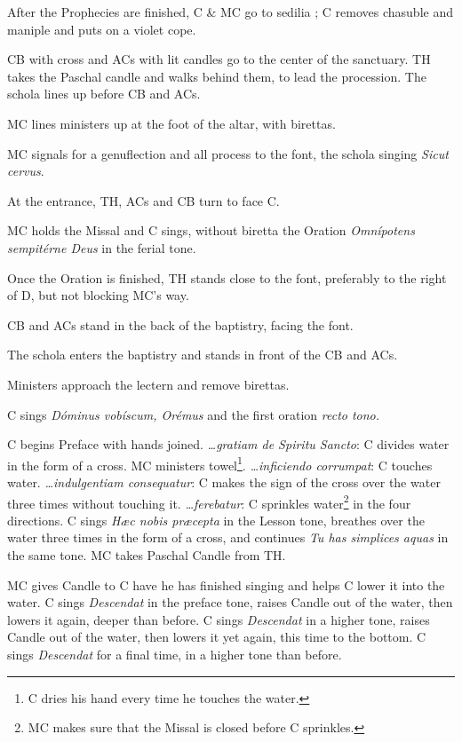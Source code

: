 {\rubric After the Prophecies are finished, C \& MC go to sedilia \pbr; C
removes chasuble and maniple and puts on a violet cope.

\rubric CB with cross and ACs with lit candles go to the center of the
sanctuary. TH takes the Paschal candle and walks behind them, to lead the
procession. The schola lines up before CB and ACs.

\rubric MC lines ministers up at the foot of the altar, with birettas.

\rubric MC signals for a genuflection and all process to the font, the schola
singing \textit{Sicut cervus}.

\rubric At the entrance, TH, ACs and CB turn to face C.

\rubric MC holds the Missal and C sings, without biretta the Oration
\textit{Omnípotens sempitérne Deus} in the ferial tone.

\rubric Once the Oration is finished, TH stands close to the font, preferably
to the right of D, but not blocking MC's way.

\rubric CB and ACs stand in the back of the baptistry, facing the font.

\rubric The schola enters the baptistry and stands in front of the CB and ACs.

\rubric Ministers approach the lectern and remove birettas.

\rubric C sings \textit{Dóminus vobíscum, Orémus} and the first oration
\textit{recto tono.}

\rubric C begins Preface with hands joined. \textit{\dots gratiam de Spiritu
Sancto}: C divides water in the form of a cross. MC ministers towel\footnote{C
dries his hand every time he touches the water.}. \textit{\dots inficiendo
corrumpat}: C touches water. \textit{\dots indulgentiam consequatur}: C makes
the sign of the cross over the water three times without touching it.
\textit{\dots ferebatur}: C sprinkles water\footnote{MC makes sure that the
Missal is closed before C sprinkles.} in the four directions. C sings
\textit{Hæc nobis præcepta} in the Lesson tone, breathes over the water three
times in the form of a cross, and continues \textit{Tu has simplices aquas} in
the same tone. MC takes Paschal Candle from TH.

\rubric MC gives Candle to C have he has finished singing and helps C lower it
into the water. C sings \textit{Descendat} in the preface tone, raises Candle
out of the water, then lowers it again, deeper than before. C sings
\textit{Descendat} in a higher tone, raises Candle out of the water, then
lowers it yet again, this time to the bottom. C sings \textit{Descendat} for a
final time, in a higher tone than before.

}
